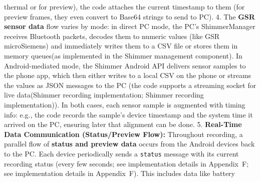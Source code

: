 thermal or for preview), the code attaches the current timestamp to them (for preview frames, they even convert to Base64 strings to send to PC). 4. The \textbf{GSR sensor data} flow varies by mode: in direct PC mode, the PC's ShimmerManager receives Bluetooth packets, decodes them to numeric values (like GSR microSiemens) and immediately writes them to a CSV file or stores them in memory queues(as implemented in the Shimmer management component). In Android-mediated mode, the Shimmer Android API delivers sensor samples to the phone app, which then either writes to a local CSV on the phone or streams the values as JSON messages to the PC (the code supports a streaming socket for live data(Shimmer recording implementation; Shimmer recording implementation)). In both cases, each sensor sample is augmented with timing info: e.g., the code records the sample's device timestamp and the system time it arrived on the PC, ensuring later that alignment can be done. 5. \textbf{Real-Time Data Communication (Status/Preview Flow):} Throughout recording, a parallel flow of \textbf{status and preview data} occurs from the Android devices back to the PC. Each device periodically sends a \texttt{status} message with its current recording status (every few seconds; see implementation details in Appendix~F; see implementation details in Appendix~F). This includes data like battery %